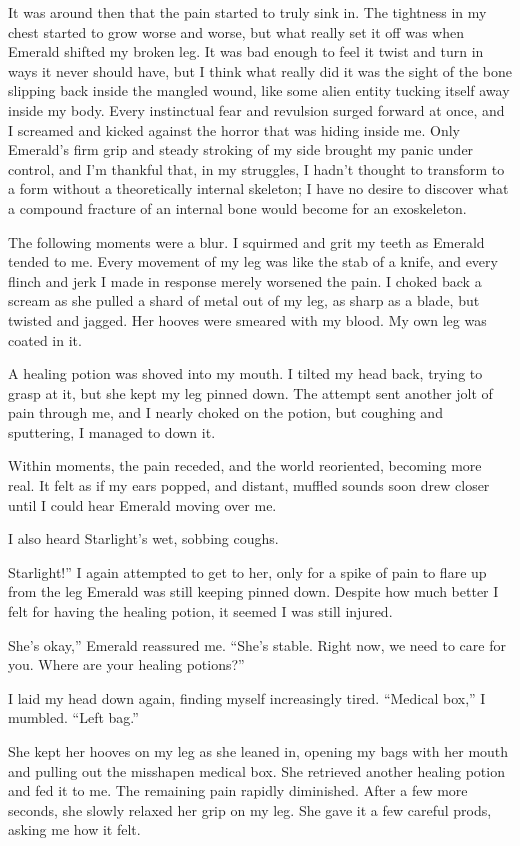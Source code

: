 It was around then that the pain started to truly sink in. The tightness in my chest started to grow worse and worse, but what really set it off was when Emerald shifted my broken leg. It was bad enough to feel it twist and turn in ways it never should have, but I think what really did it was the sight of the bone slipping back inside the mangled wound, like some alien entity tucking itself away inside my body. Every instinctual fear and revulsion surged forward at once, and I screamed and kicked against the horror that was hiding inside me. Only Emerald’s firm grip and steady stroking of my side brought my panic under control, and I’m thankful that, in my struggles, I hadn’t thought to transform to a form without a theoretically internal skeleton; I have no desire to discover what a compound fracture of an internal bone would become for an exoskeleton.

The following moments were a blur. I squirmed and grit my teeth as Emerald tended to me. Every movement of my leg was like the stab of a knife, and every flinch and jerk I made in response merely worsened the pain. I choked back a scream as she pulled a shard of metal out of my leg, as sharp as a blade, but twisted and jagged. Her hooves were smeared with my blood. My own leg was coated in it.

A healing potion was shoved into my mouth. I tilted my head back, trying to grasp at it, but she kept my leg pinned down. The attempt sent another jolt of pain through me, and I nearly choked on the potion, but coughing and sputtering, I managed to down it.

Within moments, the pain receded, and the world reoriented, becoming more real. It felt as if my ears popped, and distant, muffled sounds soon drew closer until I could hear Emerald moving over me.

I also heard Starlight’s wet, sobbing coughs.

\leavevmode{}Starlight!” I again attempted to get to her, only for a spike of pain to flare up from the leg Emerald was still keeping pinned down. Despite how much better I felt for having the healing potion, it seemed I was still injured.

\leavevmode{}She’s okay,” Emerald reassured me. “She’s stable. Right now, we need to care for you. Where are your healing potions?”

I laid my head down again, finding myself increasingly tired. “Medical box,” I mumbled. “Left bag.”

She kept her hooves on my leg as she leaned in, opening my bags with her mouth and pulling out the misshapen medical box. She retrieved another healing potion and fed it to me. The remaining pain rapidly diminished. After a few more seconds, she slowly relaxed her grip on my leg. She gave it a few careful prods, asking me how it felt.

